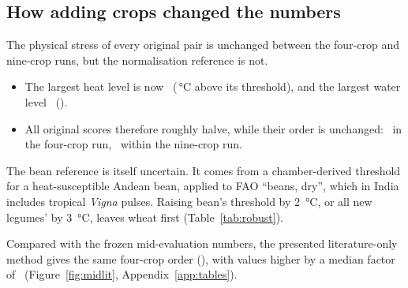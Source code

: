 \subsection{How adding crops changed the numbers}
The physical stress of every original pair is unchanged between the four-crop and nine-crop runs, but the
normalisation reference is not.
\begin{itemize}
\item The largest heat level is now \ (\,\si{\celsius} above its threshold), and the largest
water level \ ().
\item All original scores therefore roughly halve, while their order is unchanged: \orderOrigFourEq\ in the
four-crop run, \orderOrigNineEq\ within the nine-crop run.
\end{itemize}

The bean reference is itself uncertain. It comes from a chamber-derived threshold for a heat-susceptible Andean
bean, applied to FAO ``beans, dry'', which in India includes tropical \emph{Vigna} pulses. Raising bean's threshold
by \SI{2}{\celsius}, or all new legumes' by \SI{3}{\celsius}, leaves wheat first (Table~\ref{tab:robust}).

Compared with the frozen mid-evaluation numbers, the presented literature-only method gives the same four-crop order
(\orderFourEq), with values higher by a median factor of \litRatioMedian\ (Figure~\ref{fig:midlit},
Appendix~\ref{app:tables}).
